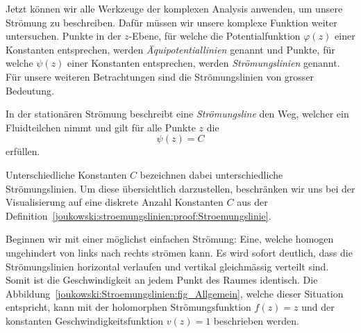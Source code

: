 		Jetzt können wir alle Werkzeuge der komplexen Analysis anwenden, um unsere Strömung zu beschreiben.
		Dafür müssen wir unsere komplexe Funktion weiter untersuchen.
		Punkte in der $z$-Ebene, für welche die Potentialfunktion $\varphi(z)$ einer Konstanten entsprechen, werden \emph{Äquipotentiallinien} genannt
		und Punkte, für welche $\psi(z)$ einer Konstanten entsprechen, werden \emph{Strömungslinien} genannt.
		Für unsere weiteren Betrachtungen sind die Strömungslinien von grosser Bedeutung.
		
		\begin{definition}[Strömungslinie]
			\label{joukowski:stroemungslinien:proof:Stroemungslinie}
			In der stationären Strömung beschreibt eine \emph{Strömungsline} den Weg, welcher ein Fluidteilchen nimmt
			und gilt für alle Punkte $z$ die
			\[
				\psi(z) = C
			\]
			erfüllen.
		\end{definition}
		Unterschiedliche Konstanten $C$ bezeichnen dabei unterschiedliche Strömungslinien.
		Um diese übersichtlich darzustellen, beschränken wir uns bei der Visualisierung auf eine diskrete Anzahl Konstanten $C$ aus der Definition~\ref{joukowski:stroemungslinien:proof:Stroemungslinie}.
		
		
		\begin{beispiel}
			\label{joukowski:stroemungslinien:beispiel:ungestoerte-Stroemung}
			Beginnen wir mit einer möglichst einfachen Strömung: Eine, welche homogen ungehindert von links nach rechts strömen kann.
			Es wird sofort deutlich, dass die Strömungslinien horizontal verlaufen und vertikal gleichmässig verteilt sind.
			Somit ist die Geschwindigkeit an jedem Punkt des Raumes identisch.
			Die Abbildung~\ref{joukowski:Stroemungslinien:fig_Allgemein}, welche dieser Situation entspricht,
			kann mit der holomorphen Strömungsfunktion $f(z) = z$ und der konstanten Geschwindigkeitsfunktion ${v(z)} = 1$ beschrieben werden.
		\end{beispiel}
		

